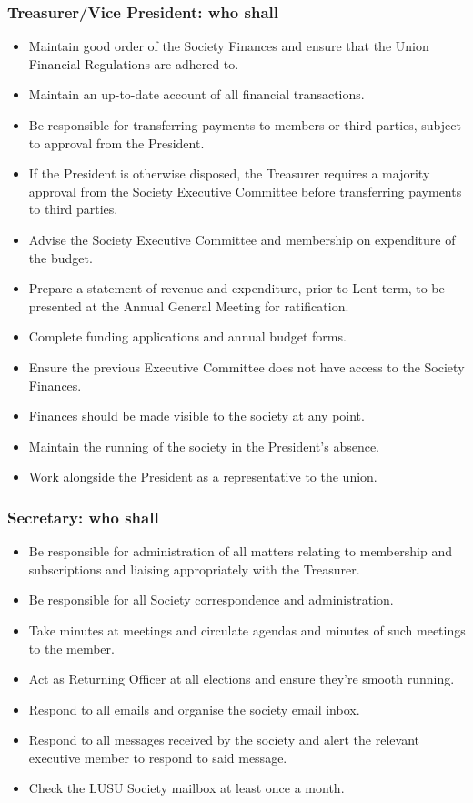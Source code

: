 \documentclass[11pt,a4paper]{article}
\begin{document}
\subsubsection{Treasurer/Vice President: who shall}
\begin{itemize}
    \item Maintain good order of the Society Finances and ensure that the Union Financial Regulations are adhered to.
    \item Maintain an up-to-date account of all financial transactions.
    \item Be responsible for transferring payments to members or third parties, subject to approval from the President.
    \item If the President is otherwise disposed, the Treasurer requires a majority approval from the Society Executive Committee before transferring payments to third parties.
    \item Advise the Society Executive Committee and membership on expenditure of the budget.
    \item Prepare a statement of revenue and expenditure, prior to Lent term, to be presented at the Annual General Meeting for ratification.
    \item Complete funding applications and annual budget forms.
    \item Ensure the previous Executive Committee does not have access to the Society Finances.
    \item Finances should be made visible to the society at any point.
    \item Maintain the running of the society in the President's absence.
    \item Work alongside the President as a representative to the union.
\end{itemize}

\subsubsection{Secretary: who shall}
\begin{itemize}
    \item Be responsible for administration of all matters relating to membership and subscriptions and liaising appropriately with the Treasurer.
    \item Be responsible for all Society correspondence and administration.
    \item Take minutes at meetings and circulate agendas and minutes of such meetings to the member.
    \item Act as Returning Officer at all elections and ensure they're smooth running.
    \item Respond to all emails and organise the society email inbox.
    \item Respond to all messages received by the society and alert the relevant executive member to respond to said message.
    \item Check the LUSU Society mailbox at least once a month.
\end{itemize}
\end{document}
